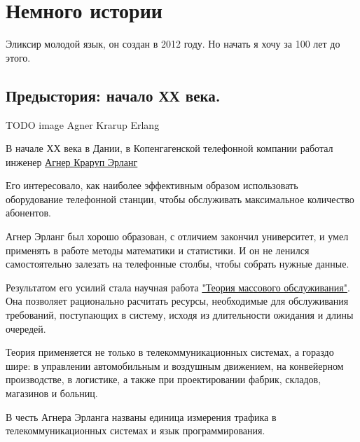 \chapter{Немного истории}

Эликсир молодой язык, он создан в 2012 году. Но начать я хочу за 100 лет до этого. 

\section{Предыстория: начало ХХ века.}

TODO image
Agner Krarup Erlang %

В начале ХХ века в Дании, в Копенгагенской телефонной компании работал инженер \href{https://ru.wikipedia.org/wiki/%D0%AD%D1%80%D0%BB%D0%B0%D0%BD%D0%B3,_%D0%90%D0%B3%D0%BD%D0%B5%D1%80_%D0%9A%D1%80%D0%B0%D1%80%D1%83%D0%BF}{Агнер Краруп Эрланг}

Его интересовало, как наиболее эффективным образом использовать оборудование телефонной станции, чтобы обслуживать максимальное количество абонентов.

Агнер Эрланг был хорошо образован, с отличием закончил университет, и умел применять в работе методы математики и статистики. И он не ленился самостоятельно залезать на телефонные столбы, чтобы собрать нужные данные.

Результатом его усилий стала научная работа \href{https://ru.wikipedia.org/wiki/%D0%A2%D0%B5%D0%BE%D1%80%D0%B8%D1%8F_%D0%BC%D0%B0%D1%81%D1%81%D0%BE%D0%B2%D0%BE%D0%B3%D0%BE_%D0%BE%D0%B1%D1%81%D0%BB%D1%83%D0%B6%D0%B8%D0%B2%D0%B0%D0%BD%D0%B8%D1%8F}{"Теория массового обслуживания"}. Она позволяет рационально расчитать ресурсы, необходимые для обслуживания требований, поступающих в систему, исходя из длительности ожидания и длины очередей.

Теория применяется не только в телекоммуникационных системах, а гораздо шире: в управлении автомобильным и воздушным движением, на конвейерном производстве, в логистике, а также при проектировании фабрик, складов, магазинов и больниц.

В честь Агнера Эрланга названы единица измерения трафика в телекоммуникационных системах и язык программирования.
